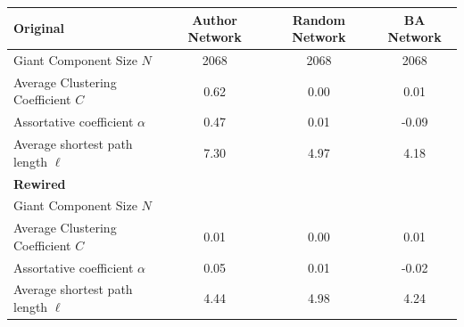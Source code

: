 \documentclass[11pt]{article}
\begin{document}
\begin{table}[h]
\centering
\begin{tabular}{lccc}
\toprule
 \textbf{Original} & \textbf{Author Network} & \textbf{Random Network} & \textbf{BA Network} \\
\midrule
Giant Component Size $N$ & 2068 & 2068 & 2068 \\
Average Clustering Coefficient $C$ & 0.62 & 0.00 & 0.01 \\
Assortative coefficient $\alpha$ & 0.47 & 0.01 & -0.09 \\
Average shortest path length $\ell$ & 7.30 & 4.97 & 4.18 \\
\midrule
\textbf{Rewired} & & & \\
\midrule
Giant Component Size $N$ &  &  &  \\
Average Clustering Coefficient $C$ & 0.01 & 0.00 & 0.01 \\
Assortative coefficient $\alpha$ & 0.05 & 0.01 & -0.02 \\
Average shortest path length $\ell$ & 4.44 & 4.98 & 4.24 \\
\bottomrule
\end{tabular}
\end{table}

\newpage


\end{document}
